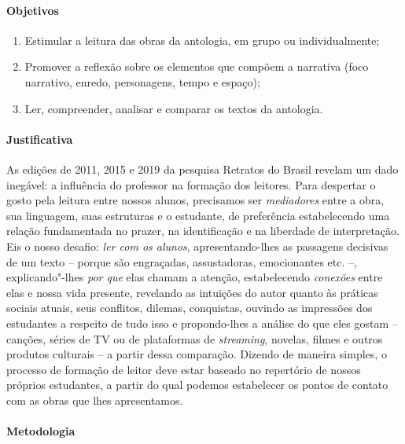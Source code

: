 \documentclass{extarticle}
\begin{document}
\paragraph{Objetivos} 

\begin{enumerate}
\item Estimular a leitura das obras da antologia, em grupo ou individualmente; 
\item Promover a reflexão sobre os elementos que compõem a narrativa
(foco narrativo, enredo, personagens, tempo e espaço); 
\item Ler, compreender, analisar e comparar os textos da antologia.
\end{enumerate}

\paragraph{Justificativa} As edições de 2011, 2015 e 2019 da pesquisa
Retratos do Brasil revelam um dado inegável: a influência do professor
na formação dos leitores. Para despertar o gosto pela leitura entre
nossos alunos, precisamos ser \emph{mediadores} entre a obra, sua
linguagem, suas estruturas e o estudante, de preferência estabelecendo
uma relação fundamentada no prazer, na identificação e na liberdade de
interpretação. Eis o nosso desafio: \emph{ler com os alunos},
apresentando-lhes as passagens decisivas de um texto -- porque são
engraçadas, assustadoras, emocionantes etc. --, explicando"-lhes
\emph{por que} elas chamam a atenção, estabelecendo \emph{conexões}
entre elas e nossa vida presente, revelando as intuições do autor quanto
às práticas sociais atuais, seus conflitos, dilemas, conquistas, ouvindo
as impressões dos estudantes a respeito de tudo isso e propondo-lhes a
análise do que eles gostam -- canções, séries de TV ou de plataformas de
\emph{streaming}, novelas, filmes e outros produtos culturais -- a
partir dessa comparação. Dizendo de maneira simples, o processo de
formação de leitor deve estar baseado no repertório de nossos próprios
estudantes, a partir do qual podemos estabelecer os pontos de contato
com as obras que lhes apresentamos.

\paragraph{Metodologia}
\end{document}
